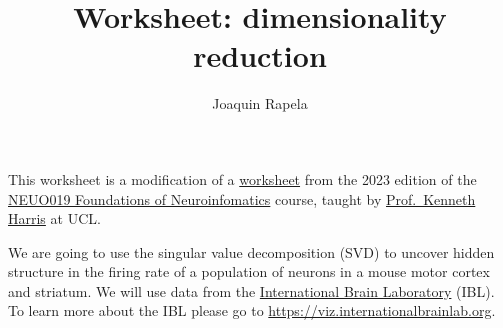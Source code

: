 \documentclass[12pt]{article}
\title{Worksheet: dimensionality reduction}
\author{Joaquin Rapela}
\begin{document}
\maketitle

This worksheet is a modification of a
\href{https://drive.google.com/file/d/1r90rlJpFKilQmNj1h27gmZdyi-RJeCq_/view}{worksheet}
from the 2023 edition of the
\href{https://www.ucl.ac.uk/cortexlab/neuroinformatics-class-page}{NEUO019
Foundations of Neuroinfomatics} course, taught by
\href{https://profiles.ucl.ac.uk/31489}{Prof.~Kenneth Harris} at UCL.

We are going to use the singular value decomposition (SVD) to uncover hidden
structure in the firing rate of a population of neurons in a mouse motor cortex
and striatum.
%
We will use data from the
\href{https://www.internationalbrainlab.com/}{International Brain Laboratory}
(IBL). To learn more about the IBL please go to \url{https://viz.internationalbrainlab.org}.
\end{document}
